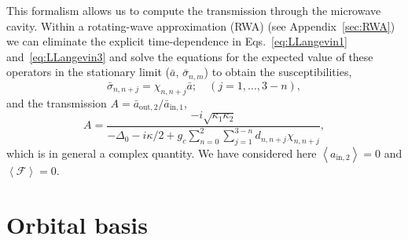 \documentclass[twocolumn,english,aps,prl,preprint,reprint,showpacs,longbibliography,showkeys]{revtex4-1}
\begin{document}
This formalism allows us to compute the transmission through the microwave cavity.
Within a rotating-wave approximation (RWA) (see Appendix~\ref{sec:RWA}) we can eliminate the explicit time-dependence in Eqs.~\eqref{eq:LLangevin1} and~\eqref{eq:LLangevin3} and solve the equations for the expected value of these operators in the stationary limit ($\bar{a}$, $\bar{\sigma}_{n,m}$) to obtain the susceptibilities,
\begin{equation}
\bar{\sigma}_{n,n+j}  =\chi_{n,n+j}\bar{a}; \quad (j=1,...,3-n) , \label{eq:suscnm}
\end{equation}
and the transmission  ${A=\bar{a}_{\mathrm{out},2}/\bar{a}_{\mathrm{in},1}}$,
\begin{equation}
A  = \frac{-i\sqrt{\kappa_1 \kappa_2}}{-\Delta_0-i\kappa/2+g_c \sum_{n=0}^{2} \sum_{j=1}^{3-n}d_{n,n+j}\chi_{n,n+j}}, \label{eq:suscnm}
\end{equation}
which is in general a complex quantity. 
We have considered here  $\left\langle a_{\mathrm{in},2}\right\rangle=0$ and $\left\langle\mathcal{F}\right\rangle=0$.





\section{Orbital basis}
\label{sec:orbital-basis}
\end{document}

